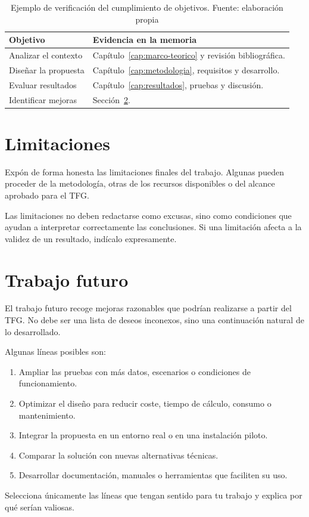 \begin{table}[!ht]
    \footnotesize
    \centering
    \caption[Ejemplo de verificación del cumplimiento de objetivos]{Ejemplo de verificación del cumplimiento de objetivos. Fuente: elaboración propia}
    \label{tab:cumplimiento-objetivos}
    \begin{tabularx}{\textwidth}{p{4cm}X}
        \toprule
        \textbf{Objetivo} & \textbf{Evidencia en la memoria} \\
        \midrule
        Analizar el contexto & Capítulo~\ref{cap:marco-teorico} y revisión bibliográfica. \\
        Diseñar la propuesta & Capítulo~\ref{cap:metodologia}, requisitos y desarrollo. \\
        Evaluar resultados & Capítulo~\ref{cap:resultados}, pruebas y discusión. \\
        Identificar mejoras & Sección~\ref{sec:trabajo-futuro}. \\
        \bottomrule
    \end{tabularx}
\end{table}

\section{Limitaciones}
\label{sec:limitaciones-conclusiones}

Expón de forma honesta las limitaciones finales del trabajo. Algunas pueden
proceder de la metodología, otras de los recursos disponibles o del alcance
aprobado para el TFG.

Las limitaciones no deben redactarse como excusas, sino como condiciones que
ayudan a interpretar correctamente las conclusiones. Si una limitación afecta a
la validez de un resultado, indícalo expresamente.

\section{Trabajo futuro}
\label{sec:trabajo-futuro}

El trabajo futuro recoge mejoras razonables que podrían realizarse a partir del
TFG. No debe ser una lista de deseos inconexos, sino una continuación natural de
lo desarrollado.

Algunas líneas posibles son:

\begin{enumerate}
    \item Ampliar las pruebas con más datos, escenarios o condiciones de funcionamiento.
    \item Optimizar el diseño para reducir coste, tiempo de cálculo, consumo o mantenimiento.
    \item Integrar la propuesta en un entorno real o en una instalación piloto.
    \item Comparar la solución con nuevas alternativas técnicas.
    \item Desarrollar documentación, manuales o herramientas que faciliten su uso.
\end{enumerate}

Selecciona únicamente las líneas que tengan sentido para tu trabajo y explica
por qué serían valiosas.
